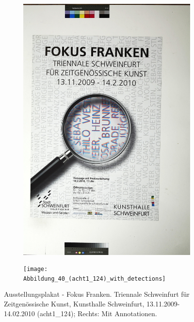 \documentclass[a4paper,12pt,ngerman]{article}
\begin{document}
\newpage
\begin{landscape}
\begin{figure}[ht]
	\begin{subfigure}[b]{0.5\linewidth}
	\centering
	\includegraphics[height=\linewidth]{Abbildung_44_(acht1_124)}
	\end{subfigure}
	\begin{subfigure}[b]{0.5\linewidth}
	\centering
	\texttt{[image: Abbildung\_40\_(acht1\_124)\_with\_detections]}
	\end{subfigure}
	\caption{Ausstellungsplakat - Fokus Franken. Triennale Schweinfurt für Zeitgenössische Kunst, Kunsthalle Schweinfurt, 13.11.2009-14.02.2010 (acht1\_124); Rechts: Mit Annotationen.}
\end{figure}
\end{landscape}
\end{document}
